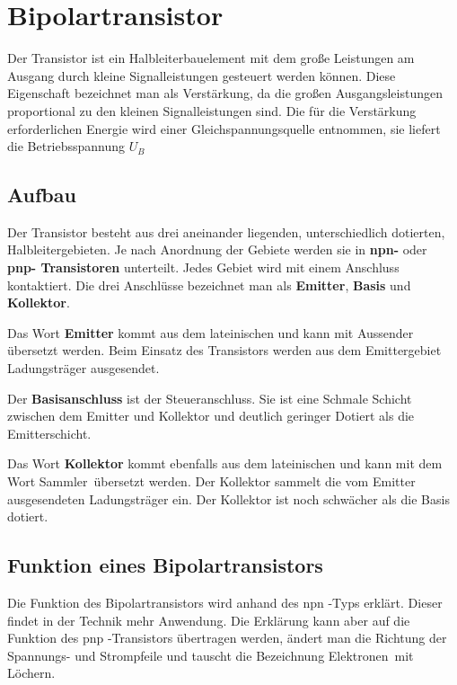 \chapter{Bipolartransistor}

Der Transistor ist ein Halbleiterbauelement mit dem große Leistungen am Ausgang durch kleine Signalleistungen gesteuert werden können. Diese Eigenschaft bezeichnet man als Verstärkung, da die großen Ausgangsleistungen proportional zu den kleinen Signalleistungen sind. Die für die Verstärkung erforderlichen Energie  wird einer Gleichspannungsquelle entnommen, sie liefert die Betriebsspannung $U_B$


\section{Aufbau}

Der Transistor besteht  aus drei aneinander liegenden, unterschiedlich dotierten, Halbleitergebieten. Je nach Anordnung der Gebiete werden sie in \textbf{npn-} oder \textbf{pnp- Transistoren} unterteilt.  Jedes Gebiet wird mit einem Anschluss kontaktiert. Die drei Anschlüsse bezeichnet man als \textbf{Emitter}, \textbf{Basis} und \textbf{Kollektor}.

Das Wort \textbf{Emitter} kommt aus dem lateinischen und kann mit \glqq Aussender\grqq \,  übersetzt werden. Beim Einsatz des Transistors werden aus dem Emittergebiet Ladungsträger ausgesendet. 

Der \textbf{Basisanschluss} ist der Steueranschluss. Sie ist eine Schmale Schicht zwischen dem Emitter und Kollektor und deutlich geringer Dotiert als die Emitterschicht. 

Das Wort \textbf{Kollektor} kommt ebenfalls aus dem lateinischen und kann mit dem Wort \glqq Sammler\grqq \, übersetzt werden. Der Kollektor sammelt die vom Emitter ausgesendeten Ladungsträger ein. Der Kollektor ist noch schwächer als die Basis dotiert. 

\section{Funktion eines Bipolartransistors}

Die Funktion des Bipolartransistors wird anhand des npn -Typs erklärt. Dieser findet in der Technik mehr Anwendung. Die Erklärung kann aber auf die Funktion des pnp -Transistors übertragen werden, ändert man die Richtung der Spannungs- und Strompfeile und tauscht die Bezeichnung \glqq Elektronen\grqq \,  mit \glqq Löchern\grqq .  

